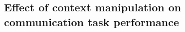 \documentclass[9pt,twocolumn,twoside]{pnas-new}
\begin{document}
\subsection*{Effect of context manipulation on communication task performance}


\end{document}
